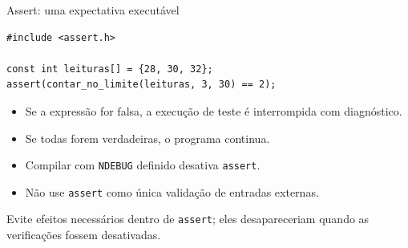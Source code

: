 \begin{frame}[fragile]{Assert: uma expectativa executável}
\begin{lstlisting}
#include <assert.h>

const int leituras[] = {28, 30, 32};
assert(contar_no_limite(leituras, 3, 30) == 2);
\end{lstlisting}
\begin{itemize}
\item Se a expressão for falsa, a execução de teste é interrompida com diagnóstico.
\item Se todas forem verdadeiras, o programa continua.
\item Compilar com \texttt{NDEBUG} definido desativa \texttt{assert}.
\item Não use \texttt{assert} como única validação de entradas externas.
\end{itemize}
\small Evite efeitos necessários dentro de \texttt{assert}; eles desapareceriam quando as verificações fossem desativadas.
\end{frame}
